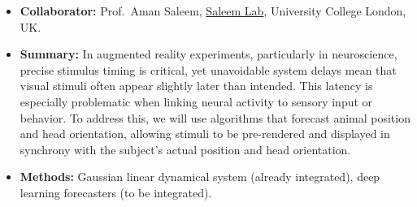 \begin{itemize}

    \item\textbf{Collaborator:} Prof.~Aman Saleem,
        \href{https://www.saleemlab.com/}{Saleem Lab}, University College London,
        UK.

    \item\textbf{Summary:} In augmented reality experiments, particularly in
        neuroscience, precise stimulus timing is critical, yet unavoidable
        system delays mean that visual stimuli often appear slightly later than
        intended. This latency is especially problematic when linking neural
        activity to sensory input or behavior. To address this, we will use
        algorithms that forecast animal position and head orientation, allowing
        stimuli to be pre-rendered and displayed in synchrony with the
        subject’s actual position and head orientation.

    \item\textbf{Methods:} Gaussian linear dynamical system (already integrated),
deep learning forecasters (to be integrated).

\end{itemize}


